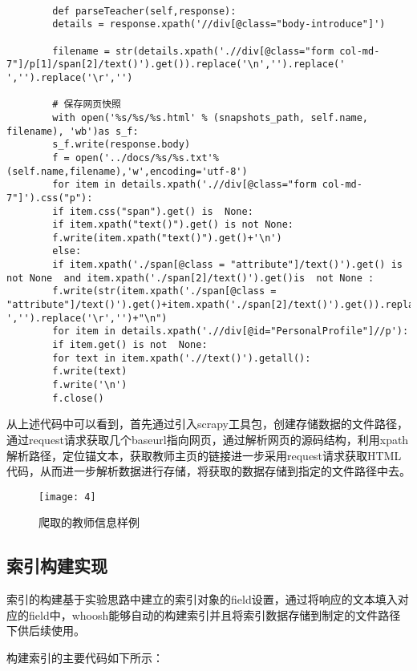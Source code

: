 \documentclass[lang=cn,11pt]{elegantpaper}
\begin{document}
\begin{lstlisting}
		
		def parseTeacher(self,response):
		details = response.xpath('//div[@class="body-introduce"]')
		
		filename = str(details.xpath('.//div[@class="form col-md-7"]/p[1]/span[2]/text()').get()).replace('\n','').replace(' ','').replace('\r','')
		
		# 保存网页快照
		with open('%s/%s/%s.html' % (snapshots_path, self.name, filename), 'wb')as s_f:
		s_f.write(response.body)
		f = open('../docs/%s/%s.txt'%(self.name,filename),'w',encoding='utf-8')
		for item in details.xpath('.//div[@class="form col-md-7"]').css("p"):
		if item.css("span").get() is  None:
		if item.xpath("text()").get() is not None:
		f.write(item.xpath("text()").get()+'\n')
		else:
		if item.xpath('./span[@class = "attribute"]/text()').get() is  not None  and item.xpath('./span[2]/text()').get()is  not None :
		f.write(str(item.xpath('./span[@class = "attribute"]/text()').get()+item.xpath('./span[2]/text()').get()).replace('\n','').replace(' ','').replace('\r','')+"\n")
		for item in details.xpath('.//div[@id="PersonalProfile"]//p'):
		if item.get() is not  None:
		for text in item.xpath('.//text()').getall():
		f.write(text)
		f.write('\n')
		f.close()
\end{lstlisting}

从上述代码中可以看到，首先通过引入scrapy工具包，创建存储数据的文件路径，通过request请求获取几个baseurl指向网页，通过解析网页的源码结构，利用xpath解析路径，定位锚文本，获取教师主页的链接进一步采用request请求获取HTML代码，从而进一步解析数据进行存储，将获取的数据存储到指定的文件路径中去。

\begin{figure}[htbp]
	\centering
	\texttt{[image: 4]}
	\caption{爬取的教师信息样例 \label{fig:4}}
\end{figure}

\subsection{索引构建实现}

索引的构建基于实验思路中建立的索引对象的field设置，通过将响应的文本填入对应的field中，whoosh能够自动的构建索引并且将索引数据存储到制定的文件路径下供后续使用。

构建索引的主要代码如下所示：
\end{document}
